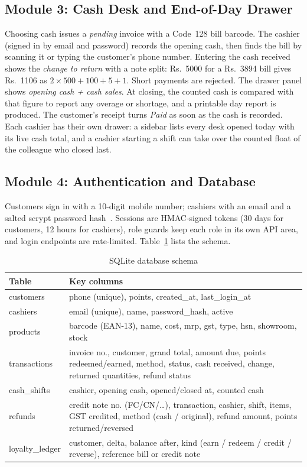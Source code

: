 \documentclass[12pt,letterpaper,twoside,openany]{report}
\begin{document}
\subsection{Module 3: Cash Desk and End-of-Day Drawer}
Choosing cash issues a \emph{pending} invoice with a Code~128 bill barcode. The cashier
(signed in by email and password) records the opening cash, then finds the bill by scanning
it or typing the customer's phone number. Entering the cash received shows the
\emph{change to return} with a note split: Rs.~5000 for a Rs.~3894 bill gives Rs.~1106 as
$2\times500+100+5+1$. Short payments are rejected. The drawer panel shows
\emph{opening cash + cash sales}. At closing, the counted cash is compared with that figure
to report any overage or shortage, and a printable day report is produced. The customer's
receipt turns \emph{Paid} as soon as the cash is recorded. Each cashier has their own drawer: a sidebar lists
every desk opened today with its live cash total, and a cashier starting a shift can take over
the counted float of the colleague who closed last.

\subsection{Module 4: Authentication and Database}
Customers sign in with a 10-digit mobile number; cashiers with an email and a salted scrypt
password hash~\cite{scrypt}. Sessions are HMAC-signed tokens (30 days for customers, 12 hours
for cashiers), role guards keep each role in its own API area, and login endpoints are
rate-limited. Table~\ref{tab:db} lists the schema.

\begin{table}[!htb]
  \centering
  \small
  \begin{tabular}{|l|p{}|}
    \hline
    \textbf{Table} & \textbf{Key columns} \\ \hline
    customers    & phone (unique), points, created\_at, last\_login\_at \\ \hline
    cashiers     & email (unique), name, password\_hash, active \\ \hline
    products     & barcode (EAN-13), name, cost, mrp, gst, type, hsn, showroom, stock \\ \hline
    transactions & invoice no., customer, grand total, amount due, points redeemed/earned, method, status, cash received, change, returned quantities, refund status \\ \hline
    cash\_shifts & cashier, opening cash, opened/closed at, counted cash \\ \hline
    refunds      & credit note no. (FC/CN/\ldots), transaction, cashier, shift, items, GST credited, method (cash / original), refund amount, points returned/reversed \\ \hline
    loyalty\_ledger & customer, delta, balance after, kind (earn / redeem / credit / reverse), reference bill or credit note \\ \hline
  \end{tabular}
  \caption{SQLite database schema}
  \label{tab:db}
\end{table}
\end{document}
